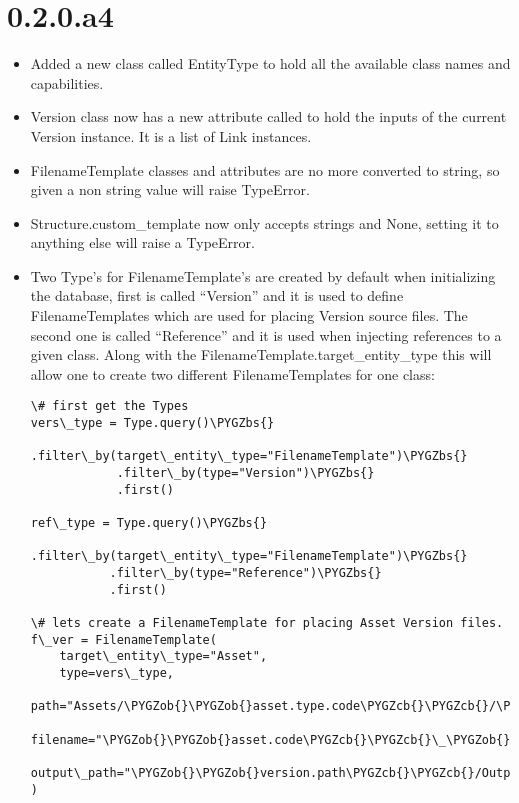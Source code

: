 \documentclass[a4paper,10pt,english]{sphinxmanual}
\def\PYGZbs{\char`\\}
\def\PYGZob{\char`\{}
\def\PYGZcb{\char`\}}
\begin{document}
\section{0.2.0.a4}
\label{changelog:a4}\begin{itemize}
\item {} 
Added a new class called EntityType to hold all the available class names and
capabilities.

\item {} 
Version class now has a new attribute called  to hold the inputs of
the current Version instance. It is a list of Link instances.

\item {} 
FilenameTemplate classes  and  attributes are no more
converted to string, so given a non string value will raise TypeError.

\item {} 
Structure.custom\_template now only accepts strings and None, setting it to
anything else will raise a TypeError.

\item {} 
Two Type's for FilenameTemplate's are created by default when initializing
the database, first is called ``Version'' and it is used to define
FilenameTemplates which are used for placing Version source files. The second
one is called ``Reference'' and it is used when injecting references to a given
class. Along with the FilenameTemplate.target\_entity\_type this will allow one
to create two different FilenameTemplates for one class:

\begin{Verbatim}[commandchars=\\\{\}]
\# first get the Types
vers\_type = Type.query()\PYGZbs{}
            .filter\_by(target\_entity\_type="FilenameTemplate")\PYGZbs{}
            .filter\_by(type="Version")\PYGZbs{}
            .first()

ref\_type = Type.query()\PYGZbs{}
           .filter\_by(target\_entity\_type="FilenameTemplate")\PYGZbs{}
           .filter\_by(type="Reference")\PYGZbs{}
           .first()

\# lets create a FilenameTemplate for placing Asset Version files.
f\_ver = FilenameTemplate(
    target\_entity\_type="Asset",
    type=vers\_type,
    path="Assets/\PYGZob{}\PYGZob{}asset.type.code\PYGZcb{}\PYGZcb{}/\PYGZob{}\PYGZob{}asset.code\PYGZcb{}\PYGZcb{}/\PYGZob{}\PYGZob{}task.type.code\PYGZcb{}\PYGZcb{}",
    filename="\PYGZob{}\PYGZob{}asset.code\PYGZcb{}\PYGZcb{}\_\PYGZob{}\PYGZob{}version.take\_name\PYGZcb{}\PYGZcb{}\_\PYGZob{}\PYGZob{}task.type.code\PYGZcb{}\PYGZcb{}\_v\PYGZob{}\PYGZob{}'\%03d'\textbar{}version.version\_number\PYGZcb{}\PYGZcb{}\PYGZob{}\PYGZob{}link.extension\PYGZcb{}\PYGZcb{}"
    output\_path="\PYGZob{}\PYGZob{}version.path\PYGZcb{}\PYGZcb{}/Outputs/\PYGZob{}\PYGZob{}version.take\_name\PYGZcb{}\PYGZcb{}"
)


\end{Verbatim}
\end{itemize}
\end{document}
